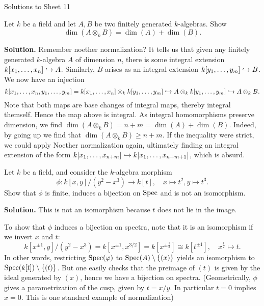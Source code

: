 \documentclass[a4paper,11pt]{article}
\begin{document}
\begin{center}
    \huge{Solutions to Sheet 11}
\end{center}

Let $k$ be a field and let $A,B$ be two finitely generated $k$-algebras.
Show 
\begin{equation*}
    \dim(A \otimes_k B) = \dim(A) + \dim(B).
\end{equation*}

\textbf{Solution.} Remember noether normalization? It tells us that given
any finitely generated $k$-algebra $A$ of dimension $n$, there is some 
integral extension $k[x_1, \dots, x_n] \hookrightarrow A$. Similarly, $B$ arises
as an integral extension $k[y_1, \dots, y_m] \hookrightarrow B$. 
We now have an injection
\begin{equation*}
    k[x_1, \dots, x_n, y_1, \dots, y_m] = k[x_1, \dots, x_n] \otimes_k k[y_1, \dots, y_m] 
    \hookrightarrow A \otimes_k k[y_1, \dots, y_m] \hookrightarrow A \otimes_k B.
\end{equation*}
Note that both maps are base changes of integral maps, thereby integral
themself. Hence the map above is integral. As integral homomorphisms 
preserve dimension, we find $\dim(A \otimes_k B) = n+m = \dim(A) + \dim(B)$. 
Indeed, by going up we find that $\dim(A \otimes_k B) \geq n+m$. If 
the inequality were strict, we could apply Noether normalization again, 
ultimately finding an integral extension of the form
$k[x_1, \dots, x_{n+m}] \hookrightarrow k[x_1, \dots, x_{n+m+1}]$, which is 
absurd.

Let $k$ be a field, and consider the $k$-algebra morphism
\begin{equation*}
    \phi: k[x,y]/(y^2 - x^3) \to k[t], \quad x \mapsto t^2, y \mapsto t^3.
\end{equation*}
Show that $\phi$ is finite, induces a bijection on $\operatorname{Spec}$ and is not
an isomorphism.

\textbf{Solution.} This is not an isomorphism because $t$ does not lie 
in the image. 

To show that $\phi$ induces a bijection on spectra, note that it is 
an isomorphism if we invert $x$ and $t$:
\begin{equation*}
    k[x^{\pm 1},y]/(y^2 - x^3) = k[x^{\pm 1}, x^{3/2}] 
    = k[x^{\pm \frac 12}] \cong k[t^{\pm 1}] ,\quad x^{\frac 12} \mapsto t.
\end{equation*}
In other words, restricting $\operatorname{Spec}(\varphi)$ to $\operatorname{Spec}(A)\setminus \{(x)\}$
yields an isomorphism to $\operatorname{Spec}(k[t])\setminus \{(t)\}$. But one easily
checks that the preimage of $(t)$ is given by the ideal generated by 
$(x)$, hence we have a bijection on spectra. (Geometrically, $\phi$
gives a parametrization of the cusp, given by $t = x/y$. In particular
$t = 0$ implies $x = 0$. This is one standard example of normalization)
\end{document}
